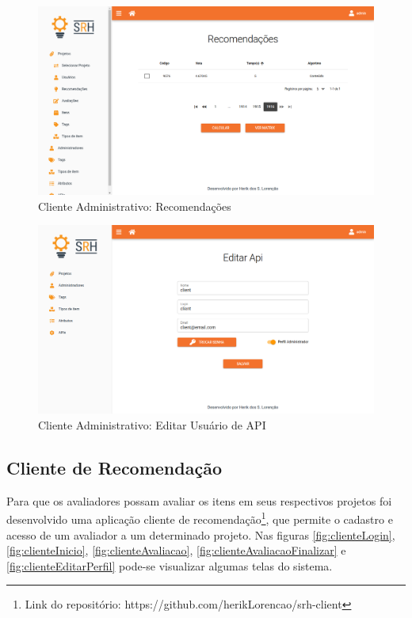 \begin{figure}[H]
	\centering
	\includegraphics[width=.9\linewidth]{imagens/adminRecomendacoes.png}
	\caption[Cliente Administrativo: Recomendações]{Cliente Administrativo: Recomendações}
    \label{fig:clienteAdminRecomendacoes}
\end{figure}

\begin{figure}[H]
	\centering
	\includegraphics[width=.9\linewidth]{imagens/adminApi.png}
	\caption[Cliente Administrativo - Login]{Cliente Administrativo: Editar Usuário de API}
    \label{fig:clienteAdminUsuarioAPI}
\end{figure}

\subsection{Cliente de Recomendação}

Para que os avaliadores possam avaliar os itens em seus respectivos projetos foi desenvolvido uma aplicação cliente de recomendação\footnote{Link do repositório: https://github.com/herikLorencao/srh-client}, que permite o cadastro e acesso de um avaliador a um determinado projeto. Nas figuras \ref{fig:clienteLogin}, \ref{fig:clienteInicio}, \ref{fig:clienteAvaliacao}, \ref{fig:clienteAvaliacaoFinalizar} e \ref{fig:clienteEditarPerfil} pode-se visualizar algumas telas do sistema.

